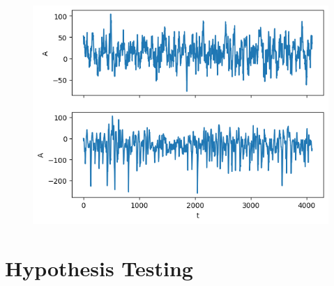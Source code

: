 \begin{frame}
  \frametitle{\insertsectionhead}
\framesubtitle{\insertsubsectionhead}
\begin{figure}
  \centering
  \includegraphics[height=0.8\textheight]{figs/eeg_intro.png}
\end{figure}
\end{frame}

\section{Hypothesis Testing}
